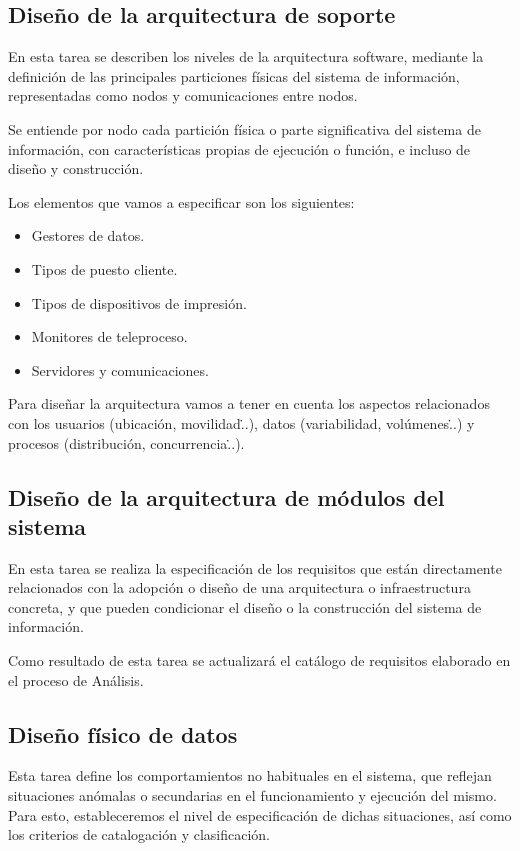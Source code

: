 \documentclass[11pt,a4paper,spanish,twoside]{report}
\begin{document}
\begin{itemize}
\subsection{Diseño de la arquitectura de soporte}
En esta tarea se describen los niveles de la arquitectura software, mediante
la definición de las principales particiones físicas del sistema de
información, representadas como nodos y comunicaciones entre nodos.

Se entiende por nodo cada partición física o parte significativa del sistema
de información, con características propias de ejecución o función, e incluso
de diseño y construcción.

Los elementos que vamos a especificar son los siguientes:
\begin{itemize}
\item Gestores de datos.
\item Tipos de puesto cliente.
\item Tipos de dispositivos de impresión.
\item Monitores de teleproceso.
\item Servidores y comunicaciones.
\end{itemize}

Para diseñar la arquitectura vamos a tener en cuenta los aspectos
relacionados con los usuarios (ubicación, movilidad\...), datos
(variabilidad, volúmenes\...) y procesos (distribución, concurrencia\...).

\subsection{Diseño de la arquitectura de módulos del sistema}
En esta tarea se realiza la especificación de los requisitos que están
directamente relacionados con la adopción o diseño de una arquitectura o
infraestructura concreta, y que pueden condicionar el diseño o la
construcción del sistema de información. 

Como resultado de esta tarea se actualizará el catálogo de requisitos
elaborado en el proceso de Análisis.

\subsection{Diseño físico de datos}
Esta tarea define los comportamientos no habituales en el sistema, que reflejan
situaciones anómalas o secundarias en el funcionamiento y ejecución del
mismo. Para esto, estableceremos el nivel de especificación de dichas
situaciones, así como los criterios de catalogación y clasificación.


\end{itemize}
\end{document}
